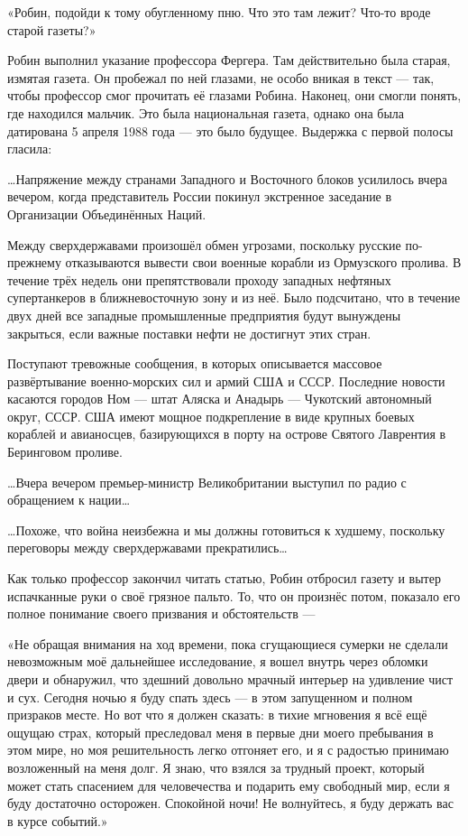 \documentclass[a4paper,12pt]{book}
\begin{document}
\par
«Робин, подойди к тому обугленному пню. Что это там лежит? Что-то вроде старой газеты?»
\par
Робин выполнил указание профессора Фергера. Там действительно была старая, измятая газета. Он пробежал по ней глазами, не особо вникая в текст — так, чтобы профессор смог прочитать её глазами Робина. Наконец, они смогли понять, где находился мальчик. Это была национальная газета, однако она была датирована 5 апреля 1988 года — это было будущее. Выдержка с первой полосы гласила:\\
\par
…Напряжение между странами Западного и Восточного блоков усилилось вчера вечером, когда представитель России покинул экстренное заседание в Организации Объединённых Наций.
\par
Между сверхдержавами произошёл обмен угрозами, поскольку русские по-прежнему отказываются вывести свои военные корабли из Ормузского пролива. В течение трёх недель они препятствовали проходу западных нефтяных супертанкеров в ближневосточную зону и из неё. Было подсчитано, что в течение двух дней все западные промышленные предприятия будут вынуждены закрыться, если важные поставки нефти не достигнут этих стран.
\par
Поступают тревожные сообщения, в которых описывается массовое развёртывание военно-морских сил и армий США и СССР. Последние новости касаются городов Ном — штат Аляска и Анадырь — Чукотский автономный округ, СССР. США имеют мощное подкрепление в виде крупных боевых кораблей и авианосцев, базирующихся в порту на острове Святого Лаврентия в Беринговом проливе.\\
\par
…Вчера вечером премьер-министр Великобритании выступил по радио с обращением к нации…\\
\par
…Похоже, что война неизбежна и мы должны готовиться к худшему, поскольку переговоры между сверхдержавами прекратились…\\
\par
Как только профессор закончил читать статью, Робин отбросил газету и вытер испачканные руки о своё грязное пальто. То, что он произнёс потом, показало его полное понимание своего призвания и обстоятельств —
\par
«Не обращая внимания на ход времени, пока сгущающиеся сумерки не сделали невозможным моё дальнейшее исследование, я вошел внутрь через обломки двери и обнаружил, что здешний довольно мрачный интерьер на удивление чист и сух. Сегодня ночью я буду спать здесь — в этом запущенном и полном призраков месте. Но вот что я должен сказать: в тихие мгновения я всё ещё ощущаю страх, который преследовал меня в первые дни моего пребывания в этом мире, но моя решительность легко отгоняет его, и я с радостью принимаю возложенный на меня долг. Я знаю, что взялся за трудный проект, который может стать спасением для человечества и подарить ему свободный мир, если я буду достаточно осторожен. Спокойной ночи! Не волнуйтесь, я буду держать вас в курсе событий.»\\
\end{document}
